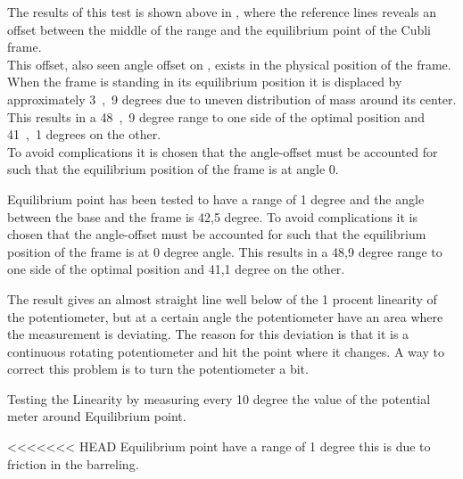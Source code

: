 \begin{minipage}{\linewidth}
\begin{minipage}{0.45\linewidth}
\begin{figure}[H]
  			\centering
  			\captionsetup{justification=centering}
  			\vspace{-.5cm}
  			\label{PotentiometerResolutionRadDeg}
  		\end{figure}\vspace{-5mm}
  	\end{minipage}
\end{minipage}

The results of this test is shown above in , where the reference lines reveals an offset between the middle of the range and the equilibrium point of the Cubli frame.\\
This offset, also seen angle offset on , exists in the physical position of the frame. When the frame is standing in its equilibrium position it is displaced by approximately \si{3,9} degrees due to uneven distribution of mass around its center.\\
This results in a \si{48,9} degree range to one side of the optimal position and \si{41,1} degrees on the other.\\
To avoid complications it is chosen that the angle-offset must be accounted for such that the equilibrium position of the frame is at angle 0.

Equilibrium point has been tested to have a range of 1 degree and the angle between the base and the frame is 42,5 degree. To avoid complications it is chosen that the angle-offset must be accounted for such that the equilibrium position of the frame is at 0 degree angle. This results in a 48,9 degree range to one side of the optimal position and 41,1 degree on the other.

The result gives an almost straight line well below of the 1 procent linearity of the potentiometer, but at a certain angle the potentiometer have an area where the measurement is deviating. The reason for this deviation is that it is a continuous rotating potentiometer and hit the point where it changes. A way to correct this problem is to turn the potentiometer a bit. 

Testing the Linearity by measuring every 10 degree the value of the potential meter around Equilibrium point.

<<<<<<< HEAD
Equilibrium point have a range of 1 degree this is due to friction in the barreling.

